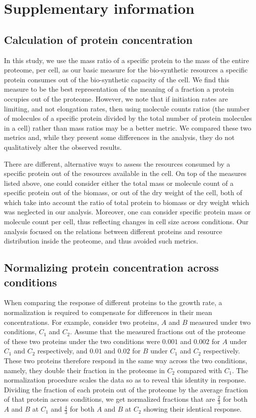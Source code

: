 \documentclass[notitlepage]{article}
\begin{document}
\section{Supplementary information}
\subsection{Calculation of protein concentration}
\label{protconc}
In this study, we use the mass ratio of a specific protein to the mass of the entire proteome, per cell, as our basic measure for the bio-synthetic resources a specific protein consumes out of the bio-synthetic capacity of the cell.
We find this measure to be the best representation of the meaning of a fraction a protein occupies out of the proteome.
However, we note that if initiation rates are limiting, and not elongation rates, then using molecule counts ratios (the number of molecules of a specific protein divided by the total number of protein molecules in a cell) rather than mass ratios may be a better metric.
We compared these two metrics and, while they present some differences in the analysis, they do not qualitatively alter the observed results.

There are different, alternative ways to assess the resources consumed by a specific protein out of the resources available in the cell.
On top of the measures listed above, one could consider either the total mass or molecule count of a specific protein out of the biomass, or out of the dry weight of the cell, both of which take into account the ratio of total protein to biomass or dry weight which was neglected in our analysis.
Moreover, one can consider specific protein mass or molecule count per cell, thus reflecting changes in cell size across conditions.
Our analysis focused on the relations between different proteins and resource distribution inside the proteome, and thus avoided such metrics.
\subsection{Normalizing protein concentration across conditions}
\label{concacrossconds}
When comparing the response of different proteins to the growth rate, a normalization is required to compensate for differences in their mean concentrations.
For example, consider two proteins, $A$ and $B$ measured under two conditions, $C_1$ and $C_2$.
Assume that the measured fractions out of the proteome of these two proteins under the two conditions were $0.001$ and $0.002$ for $A$ under $C_1$ and $C_2$ respectively, and $0.01$ and $0.02$ for $B$ under $C_1$ and $C_2$ respectively.
These two proteins therefore respond in the same way across the two conditions, namely, they double their fraction in the proteome in $C_2$ compared with $C_1$.
The normalization procedure scales the data so as to reveal this identity in response.
Dividing the fraction of each protein out of the proteome by the average fraction of that protein across conditions, we get normalized fractions that are $\frac{2}{3}$ for both $A$ and $B$ at $C_1$ and $\frac{4}{3}$ for both $A$ and $B$ at $C_2$ showing their identical response.
\end{document}
